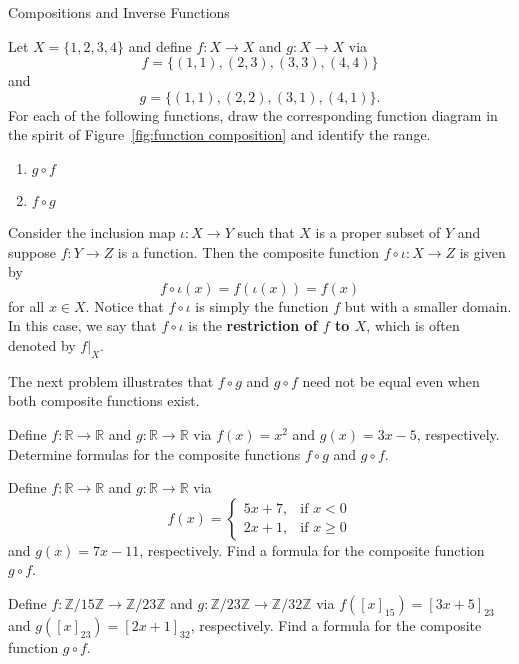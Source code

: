 \begin{section}{Compositions and Inverse Functions}
\begin{problem}
Let $X=\{1,2,3,4\}$ and define $f:X\to X$ and $g:X\to X$ via
\[
f=\{(1,1),(2,3),(3,3),(4,4)\}
\]
and
\[
g=\{(1,1),(2,2),(3,1),(4,1)\}.
\]
For each of the following functions, draw the corresponding function diagram in the spirit of Figure~\ref{fig:function composition} and identify the range.
\begin{enumerate}[label=\textrm{(\alph*)}]
\item $g\circ f$
\item $f\circ g$
\end{enumerate}
\end{problem}

\begin{example}
Consider the inclusion map $\iota:X\to Y$ such that $X$ is a proper subset of $Y$ and suppose $f:Y\to Z$ is a function. Then the composite function $f\circ \iota:X\to Z$ is given by
\[
f\circ \iota(x)=f(\iota(x))=f(x)
\]
for all $x\in X$. Notice that $f\circ \iota$ is simply the function $f$ but with a smaller domain.  In this case, we say that $f\circ \iota$ is the \textbf{restriction of $f$ to $X$}, which is often denoted by $\boxed{f|_X}$.
\end{example}

The next problem illustrates that $f\circ g$ and $g\circ f$ need not be equal even when both composite functions exist.

\begin{problem}
Define $f:\mathbb{R}\to \mathbb{R}$ and $g:\mathbb{R}\to \mathbb{R}$ via $f(x)=x^2$ and $g(x)=3x-5$, respectively. Determine formulas for the composite functions $f\circ g$ and $g\circ f$.
\end{problem}

\begin{problem}
Define $f:\mathbb{R}\to \mathbb{R}$ and $g:\mathbb{R}\to \mathbb{R}$ via
\[
f(x)=\begin{cases}
5x+7, & \text{if }x< 0\\
2x+1, & \text{if }x\geq 0
\end{cases}
\]
and $g(x)=7x-11$, respectively. Find a formula for the composite function $g\circ f$.
\end{problem}

\begin{problem}
Define $f:\mathbb{Z}/15\mathbb{Z}\to \mathbb{Z}/23\mathbb{Z}$ and $g:\mathbb{Z}/23\mathbb{Z}\to \mathbb{Z}/32\mathbb{Z}$ via $f([x]_{15})=[3x+5]_{23}$ and $g([x]_{23})=[2x+1]_{32}$, respectively. Find a formula for the composite function $g\circ f$.
\end{problem}


\end{section}
